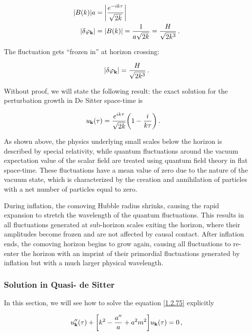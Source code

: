 \begin{align}
    \abs{B(k)} a &= \abs{\frac{e^{-ik \tau }}{\sqrt{2 k}}} \label{1.2.84}  \\
    \abs{ \delta \varphi _\textbf{k}} &= \abs{B(k)} = \frac{1}{a \sqrt{2k}} 
    = \frac{H}{\sqrt{2 k^3}}\label{1.2.85}
    \,.
\end{align}

The fluctuation gets ``frozen in'' at horizon crossing: 

\begin{align}
    \abs{ \delta \varphi _\textbf{k}} = \frac{H}{\sqrt{2 k^3}}
    \,.
\end{align}

 Without proof, we will state the following result: the exact solution for the perturbation growth in De Sitter space-time is 

\begin{align}
     u_{\mathbf{k}}(\tau ) &= \frac{e^{ik \tau }}{\sqrt{2 k}} \qty(1 - \frac{i}{k \tau })
    \,.
\end{align}

As shown above, the physics underlying small scales below the horizon is described by special relativity, while quantum fluctuations around the vacuum expectation value of the scalar field are treated using quantum field theory in flat space-time. These fluctuations have a mean value of zero due to the nature of the vacuum state, which is characterized by the creation and annihilation of particles with a net number of particles equal to zero.

During inflation, the comoving Hubble radius shrinks, causing the rapid expansion to stretch the wavelength of the quantum fluctuations. This results in all fluctuations generated at sub-horizon scales exiting the horizon, where their amplitudes become frozen and are not affected by causal contact. After inflation ends, the comoving horizon begins to grow again, causing all fluctuations to re-enter the horizon with an imprint of their primordial fluctuations generated by inflation but with a much larger physical wavelength.

\subsubsection*{Solution in Quasi- de Sitter}
In this section, we will see how to solve the equation \eqref{1.2.75} explicitly 

\begin{align}
    u''_{\mathbf{k}} (\tau )
    + 
    \qty[k^2 - \frac{a''}{a} + a^2 m^2]  u_{\mathbf{k}}(\tau ) = 0\label{1.2.88}
    \,,
\end{align}

